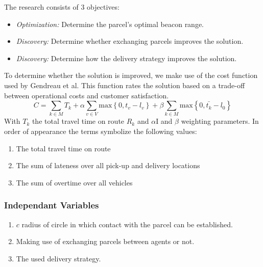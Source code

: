 \documentclass[../main.tex]{subfiles}
\begin{document}
The research consists of 3 objectives:
\begin{itemize}
	\item \textit{Optimization:} Determine the parcel's optimal beacon range.
	\item \textit{Discovery:} Determine whether exchanging parcels improves the solution.
	\item \textit{Discovery:} Determine how the delivery strategy improves the solution.
\end{itemize}
To determine whether the solution is improved, we make use of the cost function used by Gendreau et al. This function rates the solution based on a trade-off between operational costs and customer satisfaction. \cite{gendreau2006neighborhood}
$$
C = \sum_{k \in M}{T_k} + \alpha \sum_{v \in V} \text{max} \left\{ 0, t_v - l_v \right\} + \beta \sum_{k \in M} \text{max} \left\{0, \bar{t_k} - l_0 \right\}
$$
With $T_k$ the total travel time on route $R_k$ and $\alpha$I and $\beta$ weighting parameters. In order of appearance the terms symbolize the following values:
\begin{enumerate}
	\item The total travel time on route
	\item The sum of lateness over all pick-up and delivery locations
	\item The sum of overtime over all vehicles
\end{enumerate}

\subsubsection{Independant Variables}
\begin{enumerate}
	\item $c$ radius of circle in which contact with the parcel can be established.
	\item Making use of exchanging parcels between agents or not.
	\item The used delivery strategy.
\end{enumerate}
\end{document}
